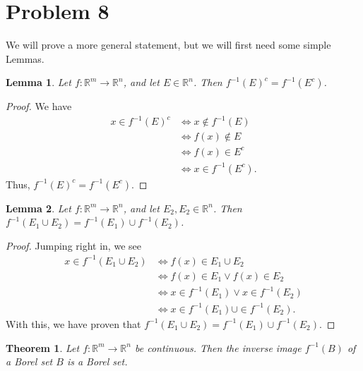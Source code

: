 \documentclass[10pt,a4paper]{article}
\theoremstyle{theorem}
\newtheorem{theorem}{Theorem}
\newtheorem{lemma}{Lemma}
\theoremstyle{definition}
\begin{document}
\section*{Problem 8}
We will prove a more general statement, but we will first need some simple Lemmas.
\begin{lemma}
Let $f: \mathbb{R}^m \to \mathbb{R}^n$, and let $E \in \mathbb{R}^n$. Then $f^{-1}(E)^c = f^{-1}(E^c)$.
\end{lemma}

\begin{proof}
We have 
\begin{align*}
x \in f^{-1}(E)^c &\iff x \not\in f^{-1}(E)\\
&\iff f(x) \not \in E\\
&\iff f(x) \in E^c\\
&\iff x \in f^{-1}(E^c).
\end{align*}
Thus,  $f^{-1}(E)^c = f^{-1}(E^c)$.
\end{proof}

\begin{lemma}
Let $f: \mathbb{R}^m \to \mathbb{R}^n$, and let $E_2, E_2 \in \mathbb{R}^n$. Then $f^{-1}(E_1 \cup E_2) = f^{-1}(E_1) \cup f^{-1}(E_2)$.
\end{lemma}

\begin{proof}
Jumping right in, we see
\begin{align*}
x \in f^{-1}(E_1 \cup E_2) &\iff f(x) \in E_1 \cup E_2\\
&\iff f(x) \in E_1 \lor f(x) \in E_2\\
&\iff x \in f^{-1}(E_1) \lor x \in f^{-1}(E_2)\\
&\iff x \in f^{-1}(E_1) \cup \in f^{-1}(E_2).
\end{align*}
With this, we have proven that $f^{-1}(E_1 \cup E_2) = f^{-1}(E_1) \cup f^{-1}(E_2)$.
\end{proof}

\begin{theorem}
Let $f: \mathbb{R}^m \to \mathbb{R}^n$ be continuous. Then the inverse image $f^{-1}(B)$ of a Borel set $B$ is a Borel set.
\end{theorem}
\end{document}
